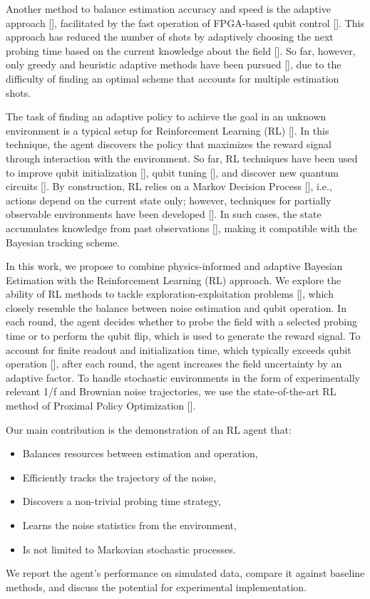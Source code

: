 \documentclass[aps,twocolumn,pra,notitlepage,]{revtex4-2}
\begin{document}
Another method to balance estimation accuracy and speed is the adaptive approach [], facilitated by the fast operation of FPGA-based qubit control []. This approach has reduced the number of shots by adaptively choosing the next probing time based on the current knowledge about the field []. So far, however, only greedy and heuristic adaptive methods have been pursued [], due to the difficulty of finding an optimal scheme that accounts for multiple estimation shots.

The task of finding an adaptive policy to achieve the goal in an unknown environment is a typical setup for Reinforcement Learning (RL) []. In this technique, the agent discovers the policy that maximizes the reward signal through interaction with the environment. So far, RL techniques have been used to improve qubit initialization [], qubit tuning [], and discover new quantum circuits []. By construction, RL relies on a Markov Decision Process [], i.e., actions depend on the current state only; however, techniques for partially observable environments have been developed []. In such cases, the state accumulates knowledge from past observations [], making it compatible with the Bayesian tracking scheme.

In this work, we propose to combine physics-informed and adaptive Bayesian Estimation with the Reinforcement Learning (RL) approach. We explore the ability of RL methods to tackle exploration-exploitation problems [], which closely resemble the balance between noise estimation and qubit operation. In each round, the agent decides whether to probe the field with a selected probing time or to perform the qubit flip, which is used to generate the reward signal. To account for finite readout and initialization time, which typically exceeds qubit operation [], after each round, the agent increases the field uncertainty by an adaptive factor. To handle stochastic environments in the form of experimentally relevant 1/f and Brownian noise trajectories, we use the state-of-the-art RL method of Proximal Policy Optimization [].

Our main contribution is the demonstration of an RL agent that:
\begin{itemize}
\item Balances resources between estimation and operation,
\item Efficiently tracks the trajectory of the noise,
\item Discovers a non-trivial probing time strategy,
\item Learns the noise statistics from the environment,
\item Is not limited to Markovian stochastic processes.
\end{itemize}
We report the agent's performance on simulated data, compare it against baseline methods, and discuss the potential for experimental implementation.
\end{document}
